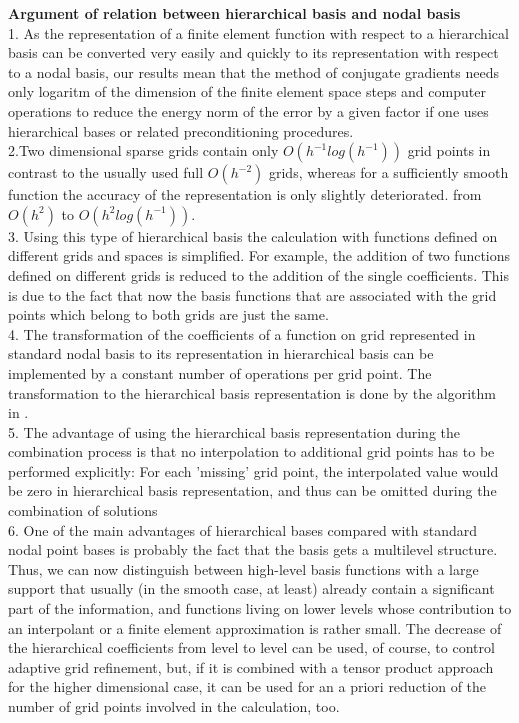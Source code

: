 \textbf{Argument of relation between hierarchical basis and nodal basis}\\
1. As the representation of a finite element function with respect to a hierarchical basis can be converted very easily and quickly to its representation with respect to a nodal basis, our results mean that the method of conjugate gradients needs only logaritm of the dimension of the finite element space steps and computer operations to reduce the energy norm of the error by a given factor if one uses hierarchical bases or related preconditioning procedures. \cite{Yserentant1986} \\

2.Two dimensional sparse grids contain only $O({h}^{-1}log({h}^{-1}))$ grid points in contrast to the usually used full $O({h}^{-2}) $ grids, whereas for a sufficiently smooth function the accuracy of the representation is only slightly deteriorated. from $O(h^2) $ to $O(h^{2}log({h}^{-1}))$. \cite{Griebel1992b} \\

3. Using this type of hierarchical basis the calculation with functions defined on different grids and spaces is simplified. For example, the addition of two functions defined on different grids is reduced to the addition of the single coefficients. This is due to the fact that now the basis functions that are associated with the grid points which belong to both grids are just the same. \cite{Griebel1992b} \\

4. The transformation of the coefficients of a function on grid represented in standard nodal basis to its representation in hierarchical basis can be implemented by a constant number of operations per grid point. The transformation to the hierarchical basis representation is done by the algorithm in \cite{Griebel1992b}. \\

5. The advantage of using the hierarchical basis representation during the combination process is that no interpolation to additional grid points has to be performed explicitly: For each 'missing' grid point, the interpolated value would be zero in hierarchical basis representation, and thus can be omitted during the combination of solutions\cite{Griebel1995} \\

6. One of the main advantages of hierarchical bases compared with standard nodal point bases is probably the fact that the basis gets a multilevel structure. Thus, we can now distinguish between high-level basis functions with a large support that usually (in the smooth case, at least) already contain a significant part of the information, and functions living on lower levels whose contribution to an interpolant or a finite element approximation is rather small. The decrease of the hierarchical coefficients from level to level can be used, of course, to control adaptive grid refinement, but, if it is combined with a tensor product approach for the higher dimensional case, it can be used for an a priori reduction of the number of grid points involved in the calculation, too.\cite{Bungartz1998}\\

